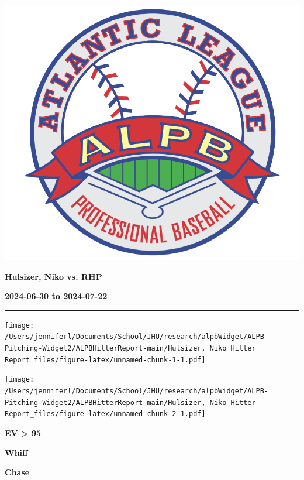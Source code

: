 \documentclass[
]{article}
\author{}
\date{\vspace{-2.5em}2025-02-16}
\begin{document}
\begin{multicols}{3} %

\includegraphics[width=0.4\columnwidth]{ALPB_Logo} %

\hspace{0pt}
\vfill
\hspace{-0.5in}\large\textbf{Hulsizer, Niko vs. RHP} %
\vfill
\hspace{0pt}

\hspace{0pt}
\vfill
\large\textbf{2024-06-30 to 2024-07-22} %
\vfill
\hspace{0pt}

\end{multicols}
\vspace{-0.35in}

\noindent

\rule{\textwidth}{0.75pt}

\texttt{[image: /Users/jenniferl/Documents/School/JHU/research/alpbWidget/ALPB-Pitching-Widget2/ALPBHitterReport-main/Hulsizer, Niko Hitter Report\_files/figure-latex/unnamed-chunk-1-1.pdf]}

\texttt{[image: /Users/jenniferl/Documents/School/JHU/research/alpbWidget/ALPB-Pitching-Widget2/ALPBHitterReport-main/Hulsizer, Niko Hitter Report\_files/figure-latex/unnamed-chunk-2-1.pdf]}

\begin{multicols}{3} %



\hspace{0.2in}\centerline{\LARGE\textbf{EV > 95}}



\hspace{-0.05in}\centerline{\LARGE\textbf{Whiff}}



\hspace{-0.05in}\centerline{\LARGE\textbf{Chase}}
\end{multicols}
\end{document}
